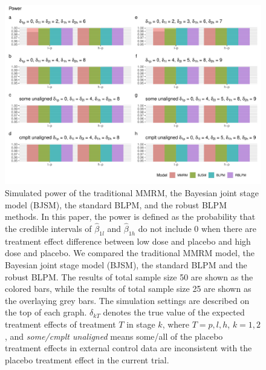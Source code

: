\begin{figure}
\centerline{\includegraphics[width=\textwidth]{chapters/figures/CRpower_longitudinal.pdf}}
\caption{Simulated power of the traditional MMRM, the Bayesian joint stage model (BJSM), the standard BLPM, and the robust BLPM methods. In this paper, the power is defined as the probability that the credible intervals of $\hat{\beta}_{1l}$ and $\hat{\beta}_{1h}$ do not include 0 when there are treatment effect difference between low dose and placebo and high dose and placebo. We compared the traditional MMRM model, the Bayesian joint stage model (BJSM), the standard BLPM and the robust BLPM. The results of total sample size 50 are shown as the colored bars, while the results of total sample size 25 are shown as the overlaying grey bars. The simulation settings are described on the top of each graph. $\delta_{kT}$ denotes the true value of the expected treatment effects of treatment $T$ in stage $k$, where $T = p, l, h$, $k = 1, 2$, and \emph{some/cmplt unaligned} means some/all of the placebo treatment effects in external control data are inconsistent with the placebo treatment effect in the current trial.}
\label{fig:power_25}
\end{figure}

